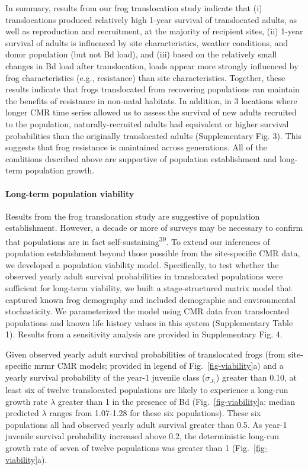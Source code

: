 \documentclass[
  letterpaper,
  DIV=11,
  numbers=noendperiod]{scrartcl}
\let\oldparagraph\paragraph
\renewcommand{\paragraph}[1]{\oldparagraph{#1}\mbox{}}
\begin{document}
In summary, results from our frog translocation study indicate that (i)
translocations produced relatively high 1-year survival of translocated
adults, as well as reproduction and recruitment, at the majority of
recipient sites, (ii) 1-year survival of adults is influenced by site
characteristics, weather conditions, and donor population (but not Bd
load), and (iii) based on the relatively small changes in Bd load after
translocation, loads appear more strongly influenced by frog
characteristics (e.g., resistance) than site characteristics. Together,
these results indicate that frogs translocated from recovering
populations can maintain the benefits of resistance in non-natal
habitats. In addition, in 3 locations where longer CMR time series
allowed us to assess the survival of new adults recruited to the
population, naturally-recruited adults had equivalent or higher survival
probabilities than the originally translocated adults (Supplementary
Fig. 3). This suggests that frog resistance is maintained across
generations. All of the conditions described above are supportive of
population establishment and long-term population growth.

\paragraph{Long-term population
viability}\label{long-term-population-viability}

Results from the frog translocation study are suggestive of population
establishment. However, a decade or more of surveys may be necessary to
confirm that populations are in fact
self-sustaining\textsuperscript{39}. To extend our inferences of
population establishment beyond those possible from the site-specific
CMR data, we developed a population viability model. Specifically, to
test whether the observed yearly adult survival probabilities in
translocated populations were sufficient for long-term viability, we
built a stage-structured matrix model that captured known frog
demography and included demographic and environmental stochasticity. We
parameterized the model using CMR data from translocated populations and
known life history values in this system (Supplementary Table 1).
Results from a sensitivity analysis are provided in Supplementary Fig.
4.

Given observed yearly adult survival probabilities of translocated frogs
(from site-specific mrmr CMR models; provided in legend of
Fig.~\ref{fig-viability}a) and a yearly survival probability of the
year-1 juvenile class (\(\sigma_{J_1}\)) greater than 0.10, at least six
of twelve translocated populations are likely to experience a long-run
growth rate \(\lambda\) greater than 1 in the presence of Bd
(Fig.~\ref{fig-viability}a; median predicted \(\lambda\) ranges from
1.07-1.28 for these six populations). These six populations all had
observed yearly adult survival greater than 0.5. As year-1 juvenile
survival probability increased above 0.2, the deterministic long-run
growth rate of seven of twelve populations was greater than 1
(Fig.~\ref{fig-viability}a).
\end{document}
